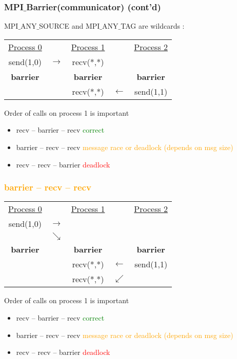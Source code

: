 \begin{frame}[containsverbatim]
\frametitle{MPI$\_$Barrier(communicator) (cont'd)}
MPI$\_$ANY$\_$SOURCE and MPI$\_$ANY$\_$TAG are wildcards :

\begin{tabular}{ c c c c c}
\underline{Process 0} &   & \underline{Process 1} &  & \underline{Process 2} \\
send(1,0) & $\longrightarrow$  & recv(*,*) &  &  \\
\hline
{\bf barrier} &   & {\bf barrier} &  & {\bf barrier} \\
\hline
          &  & recv(*,*) & $\longleftarrow$       & send(1,1)   \\
\end{tabular}		

Order of calls on process 1 is important

\begin{itemize}
	\item{recv -- barrier -- recv \textcolor{green}{correct}}
	\item{barrier -- recv -- recv \textcolor{orange}{message race or deadlock (depends on msg size)}}
	\item{recv -- recv -- barrier \textcolor{red}{deadlock}}
\end{itemize}
\end{frame}


\begin{frame}[containsverbatim]
\frametitle{\textcolor{orange}{barrier -- recv -- recv}}

\begin{tabular}{ c c c c c}
\underline{Process 0} &   & \underline{Process 1} &  & \underline{Process 2} \\
send(1,0) & $\longrightarrow$  &  &  &  \\
 & $\searrow$  &  &  &  \\
\hline
{\bf barrier} &   & {\bf barrier} &  & {\bf barrier} \\
\hline
          &  & recv(*,*) & $\longleftarrow$       & send(1,1)   \\
          &  & recv(*,*) & $\swarrow$       &    \\
\end{tabular}		

Order of calls on process 1 is important

\begin{itemize}
	\item{recv -- barrier -- recv \textcolor{green}{correct}}
	\item{barrier -- recv -- recv \textcolor{orange}{message race or deadlock (depends on msg size)}}
	\item{recv -- recv -- barrier \textcolor{red}{deadlock}}
\end{itemize}
\end{frame}

